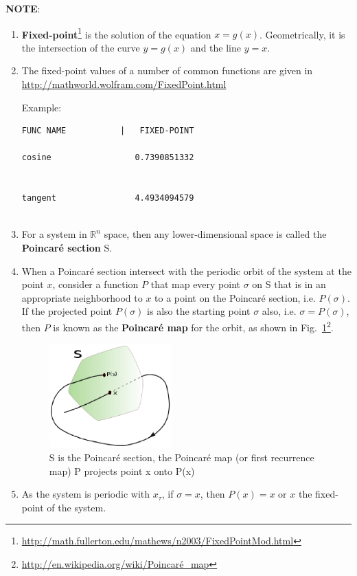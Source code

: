 {\bf NOTE}: 
\begin{enumerate}
\item {\bf Fixed-point}\footnote{\url{http://math.fullerton.edu/mathews/n2003/FixedPointMod.html}} is the solution of the equation $x=g(x)$. 
  Geometrically, it is the intersection of the curve $y=g(x)$ and the
  line $y=x$. 
  
\item The fixed-point values of a number of common functions are given in 
\url{http://mathworld.wolfram.com/FixedPoint.html}

Example:
\begin{verbatim}
FUNC NAME           |   FIXED-POINT

cosine                 0.7390851332


tangent                4.4934094579


\end{verbatim}

\item For a system in $\mathbb{R}^n$ space, then any
  lower-dimensional space is called the {\bf Poincar\'e section} S. 

\item When a Poincar\'e section intersect with the periodic orbit of
  the system at the point $x$, consider a function $P$ that map every
  point $\sigma$ on S that is in an appropriate neighborhood to $x$ to
  a point on the Poincar\'e section, i.e. $P(\sigma)$. If the
  projected 
  point $P(\sigma)$ is also the starting point $\sigma$ also,
  i.e. $\sigma=P(\sigma)$, 
  then $P$ is known as
  the 
  {\bf Poincar\'e map} for the orbit, as shown in
  Fig.~\ref{fig:Poincare_map}\footnote{\url{http://en.wikipedia.org/wiki/Poincaré_map}}. 

\begin{figure}[hbt]
  \centerline{\includegraphics[height=4cm,
    angle=0]{./images/Poincare_map.eps}}
\caption{S is the Poincar\'e section, the Poincar\'e map (or first
  recurrence map) P projects point x onto P(x)}
\label{fig:Poincare_map}
\end{figure}


\item As the system is periodic with $x_\tau$, if $\sigma=x$, then
  $P(x)=x$ or $x$ the fixed-point of the system.

\end{enumerate}

